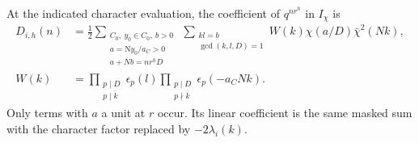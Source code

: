 \begin{lemma}\label{tame:coefficient}
At the indicated character evaluation, the coefficient of \(q^{nr^h}\)
in \(I_\chi\) is
\begin{equation}\label{tame:coefficient-formula}
 \begin{split}
 D_{i,h}(n)
  &=\frac12\sum_{\substack{C_0,\ y_0\in C_0,\ b>0\\
                 a=\mathrm Ny_0/a_C>0\\a+Nb=nr^hD}}
       \ \sum_{\substack{kl=b\\\gcd(k,l,D)=1}}
         W(k)\chi(a/D)\bar\chi^2(Nk),\\
 W(k)
  &=\prod_{\substack{p\mid D\\p\mid k}}\epsilon_p(l)
     \prod_{\substack{p\mid D\\p\nmid k}}\epsilon_p(-a_CNk).
 \end{split}
\end{equation}
Only terms with \(a\) a unit at \(r\) occur. Its linear coefficient
is the same masked sum with the character factor replaced by
\(-2\lambda_i(k)\).
\end{lemma}


